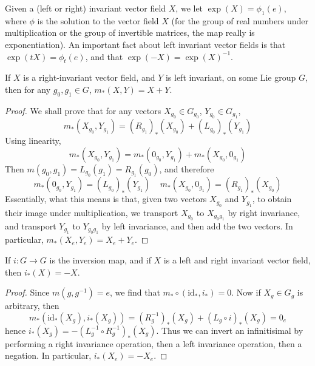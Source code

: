 Given a (left or right) invariant vector field $X$, we let $\exp(X) = \phi_1(e)$, where $\phi$ is the solution to the vector field $X$ (for the group of real numbers under multiplication or the group of invertible matrices, the map really is exponentiation). An important fact about left invariant vector fields is that $\exp(tX) = \phi_t(e)$, and that $\exp(-X) = \exp(X)^{-1}$. 

\begin{theorem}
    If $X$ is a right-invariant vector field, and $Y$ is left invariant, on some Lie group $G$, then for any $g_0, g_1 \in G$, $m_*(X,Y) = X + Y$.
\end{theorem}
\begin{proof}
    We shall prove that for any vectors $X_{g_0} \in G_{g_0}$, $Y_{g_0} \in G_{g_1}$,
    \[ m_*(X_{g_0}, Y_{g_1}) = (R_{g_1})_*(X_{g_0}) + (L_{g_0})_*(Y_{g_1}) \]
    Using linearity,
    \[ m_*(X_{g_0}, Y_{g_1}) = m_*(0_{g_0}, Y_{g_1}) + m_*(X_{g_0}, 0_{g_1}) \]
    Then $m(g_0, g_1) = L_{g_0}(g_1) = R_{g_1}(g_0)$, and therefore
    \[ m_*(0_{g_0}, Y_{g_1}) = (L_{g_0})_*(Y_{g_1})\ \ \ \ \ m_*(X_{g_0}, 0_{g_1}) = (R_{g_1})_*(X_{g_0}) \]
    Essentially, what this means is that, given two vectors $X_{g_0}$ and $Y_{g_1}$, to obtain their image under multiplication, we transport $X_{g_0}$ to $X_{g_0g_1}$ by right invariance, and transport $Y_{g_1}$ to $Y_{g_0g_1}$ by left invariance, and then add the two vectors. In particular, $m_*(X_e, Y_e) = X_e + Y_e$.
\end{proof}

\begin{theorem}
    If $i: G \to G$ is the inversion map, and if $X$ is a left and right invariant vector field, then $i_*(X) = -X$.
\end{theorem}
\begin{proof}
    Since $m(g,g^{-1}) = e$, we find that $m_* \circ (\text{id}_*, i_*) = 0$. Now if $X_g \in G_g$ is arbitrary, then
    \[ m_*(\text{id}_*(X_g), i_*(X_g)) = (R_g^{-1})_*(X_g) + (L_g \circ i)_*(X_g) = 0_e \]
    hence $i_*(X_g) = - (L_g^{-1} \circ R_g^{-1})_*(X_g)$. Thus we can invert an infinitisimal by performing a right invariance operation, then a left invariance operation, then a negation. In particular, $i_*(X_e) = - X_e$.
\end{proof}























